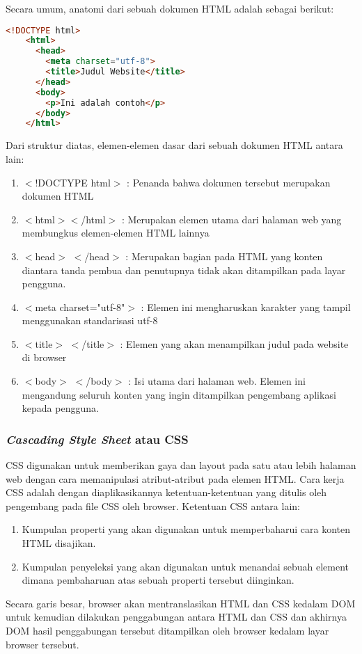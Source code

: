 \documentclass[pi.tex]{subfile}
\begin{document}
Secara umum, anatomi dari sebuah dokumen HTML adalah sebagai berikut:\\
  \begin{lstlisting}[language=HTML]
    <!DOCTYPE html>
    <html>
      <head>
        <meta charset="utf-8">
        <title>Judul Website</title>
      </head>
      <body>
        <p>Ini adalah contoh</p>
      </body>
    </html>
  \end{lstlisting}
Dari struktur diatas, elemen-elemen dasar dari sebuah dokumen HTML antara lain:
\begin{enumerate}
\item $<$!DOCTYPE html$>$ : Penanda bahwa dokumen tersebut merupakan dokumen HTML
\item $<$html$>$$<$/html$>$ : Merupakan elemen utama dari halaman web yang membungkus elemen-elemen HTML lainnya
\item $<$head$>$ $<$/head$>$ : Merupakan bagian pada HTML yang konten diantara tanda pembua dan penutupnya tidak akan ditampilkan pada layar pengguna.
\item $<$meta charset="utf-8"$>$ : Elemen ini mengharuskan karakter yang tampil menggunakan standarisasi utf-8
\item $<$title$>$ $<$/title$>$ : Elemen yang akan menampilkan judul pada website di browser
  \item $<$body$>$ $<$/body$>$ : Isi utama dari halaman web. Elemen ini mengandung seluruh konten yang ingin ditampilkan pengembang aplikasi kepada pengguna.
\end{enumerate}

\subsubsection{\emph{Cascading Style Sheet} atau CSS}
CSS digunakan untuk memberikan gaya dan layout pada satu atau lebih halaman web dengan cara memanipulasi atribut-atribut pada elemen HTML. Cara kerja CSS adalah dengan diaplikasikannya ketentuan-ketentuan yang ditulis oleh pengembang pada file CSS oleh browser. Ketentuan CSS antara lain:
\begin{enumerate}
\item Kumpulan properti yang akan digunakan untuk memperbaharui cara konten HTML disajikan.
\item Kumpulan penyeleksi yang akan digunakan untuk menandai sebuah element dimana pembaharuan atas sebuah properti tersebut diinginkan.
\end{enumerate}
Secara garis besar, browser akan mentranslasikan HTML dan CSS kedalam DOM untuk kemudian dilakukan penggabungan antara HTML dan CSS dan akhirnya DOM hasil penggabungan tersebut ditampilkan oleh browser kedalam layar browser tersebut.
\end{document}
